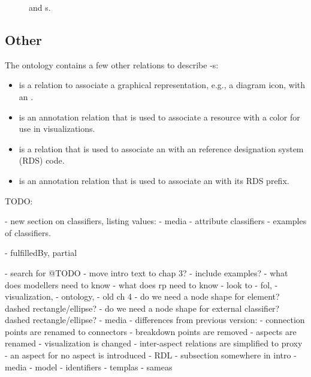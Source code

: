 \begin{figure}
\centering

\caption{\label{uml-attribute}
 and s.}
\end{figure}



\subsection{Other}

The ontology contains a few other relations to describe -s:

\begin{itemize}
\item {} is a relation to associate a graphical representation, e.g., a diagram icon, with an .

\item {} is an annotation relation that is used to associate a resource with a color for use in visualizations.

\item {} is a relation that is used to associate an  with an reference designation system (RDS) code.

\item {} is an annotation relation that is used to associate an  with its RDS prefix.

\end{itemize}











TODO:

- new section on classifiers, listing values:
  - media
  - attribute classifiers
  - examples of classifiers.
  
- fulfilledBy, partial

- search for @TODO
- move intro text to chap 3?
- include examples?
- what does modellers need to know
- what does rp need to know
- look to
  - fol,
  - visualization,
  - ontology,
  - old ch 4
  - do we need a node shape for element? dashed rectangle/ellipse?
  - do we need a node shape for external classifier? dashed rectangle/ellipse?
- media
- differences from previous version:
  - connection points are renamed to connectors
  - breakdown points are removed
  - aspects are renamed
  - visualization is changed
  - inter-aspect relations are simplified to proxy
  - an aspect for no aspect is introduced
- RDL
  - subsection somewhere in intro
    - media
- model
- identifiers
- templas
- sameas


